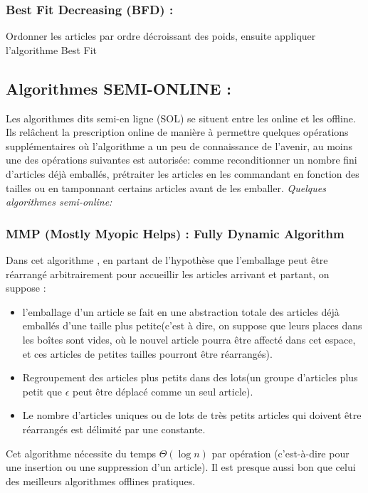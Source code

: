 \documentclass[class=report, crop=false]{standalone}
\begin{document}
        \subsubsection{Best Fit Decreasing (BFD) :}
        Ordonner les articles par ordre décroissant des poids, ensuite appliquer l’algorithme Best Fit
        \subsection{Algorithmes SEMI-ONLINE :}
        Les algorithmes dits semi-en ligne (SOL) se situent entre les online et les offline. Ils relâchent la prescription online de manière à permettre quelques opérations supplémentaires où l'algorithme a un peu de connaissance de l'avenir, au moins une des opérations suivantes est autorisée: comme reconditionner un nombre fini d'articles déjà emballés, prétraiter les articles en les commandant en fonction des tailles ou en tamponnant certains articles avant de les emballer. 
        \emph{Quelques algorithmes semi-online:}
        \subsubsection{MMP (Mostly Myopic Helps) : Fully Dynamic Algorithm}
        Dans cet algorithme \cite{ivkovic1998fully}, en partant de l’hypothèse que l'emballage peut être réarrangé arbitrairement pour accueillir les articles arrivant et partant, on suppose :
        \renewcommand{\labelitemi}{$\circ$}  
        \begin{itemize}
            \item l’emballage d’un article se fait en une abstraction totale des articles déjà emballés d’une taille plus petite(c’est à dire, on suppose que leurs places dans les boîtes sont vides, où le nouvel article pourra être affecté dans cet espace, et ces articles de petites tailles pourront être réarrangés).
            \item Regroupement des articles plus petits dans des lots(un groupe d'articles plus petit que \(\epsilon\) peut être déplacé comme un seul article).
            \item Le nombre d'articles uniques ou de lots de très petits articles qui doivent être réarrangés est délimité par une constante.
        \end{itemize}
        Cet algorithme nécessite du temps \(\Theta(\log n)\) par opération (c'est-à-dire pour une insertion ou une suppression d'un article). Il est presque aussi bon que celui des meilleurs algorithmes offlines pratiques.
\end{document}
